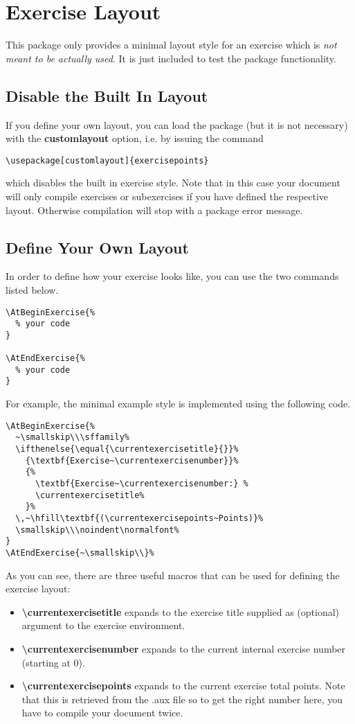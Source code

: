 \documentclass[
  twocolumn,%
  fontsize=9pt,%
  DIV=calc,%
  numbers=noendperiod%
]{scrartcl}
\begin{document}
\section{Exercise Layout}
This package only provides a minimal layout style for an exercise which is \emph{not meant to be actually used}. It is just included to test the package functionality.

\subsection{Disable the Built In Layout}
If you define your own layout, you can load the package (but it is not necessary) with the \textcolor{NavyBlue}{\ttfamily\bfseries customlayout} option, i.e. by issuing the command 
\begin{lstlisting}
\usepackage[customlayout]{exercisepoints}
\end{lstlisting}
which disables the built in exercise style. Note that in this case your document will only compile exercises or subexercises if you have defined the respective layout. Otherwise compilation will stop with a package error message.

\subsection{Define Your Own Layout}
In order to define how your exercise looks like, you can use the two commands listed below.
\begin{lstlisting}
\AtBeginExercise{%
  % your code
}

\AtEndExercise{%
  % your code
}
\end{lstlisting}
For example, the minimal example style is implemented using the following code.
\begin{lstlisting}
\AtBeginExercise{%
  ~\smallskip\\\sffamily%
  \ifthenelse{\equal{\currentexercisetitle}{}}%
    {\textbf{Exercise~\currentexercisenumber}}%
    {%
      \textbf{Exercise~\currentexercisenumber:} %
      \currentexercisetitle%
    }%
  \,~\hfill\textbf{(\currentexercisepoints~Points)}%
  \smallskip\\\noindent\normalfont%
}
\AtEndExercise{~\smallskip\\}%
\end{lstlisting}
As you can see, there are three useful macros that can be used for defining the exercise layout:
\begin{itemize}
  \item \textcolor{NavyBlue}{\ttfamily\bfseries\textbackslash currentexercisetitle} expands to the exercise title supplied as (optional) argument to the exercise environment.
  \item \textcolor{NavyBlue}{\ttfamily\bfseries\textbackslash currentexercisenumber} expands to the current internal exercise number (starting at $0$). 
  \item \textcolor{NavyBlue}{\ttfamily\bfseries\textbackslash currentexercisepoints} expands to the current exercise total points. Note that this is retrieved from the .aux file so to get the right number here, you have to compile your document twice.
\end{itemize}
\end{document}
